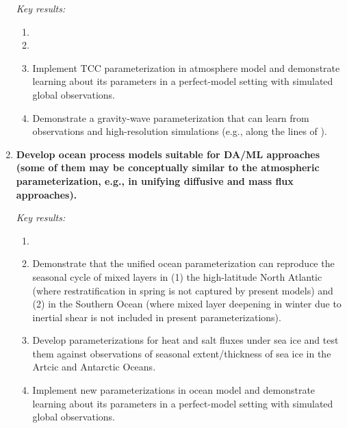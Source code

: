 \documentclass{article}
\begin{document}
\begin{enumerate}
    \emph{Key results:}
    \begin{enumerate}
        \item {}
        \item {}
        \item Implement TCC parameterization in atmosphere model and demonstrate learning about its parameters in a perfect-model setting with simulated global observations.
        \item Demonstrate a gravity-wave parameterization that can learn from observations and high-resolution simulations (e.g., along the lines of \citet{Garner18a, Zhao18a}).
    \end{enumerate}
    
     \item \textbf{Develop ocean process models suitable for DA/ML approaches (some of them may be conceptually similar to the atmospheric parameterization, e.g., in unifying diffusive and mass flux approaches).}
    
    \emph{Key results:}
    \begin{enumerate}
        \item {}
        \item Demonstrate that the unified ocean parameterization can reproduce the seasonal cycle of mixed layers in (1) the high-latitude North Atlantic (where restratification in spring is not captured by present models) and (2) in the Southern Ocean (where mixed layer deepening in winter due to inertial shear is not included in present parameterizations).
        \item Develop parameterizations for heat and salt fluxes under sea ice and test them against observations of seasonal extent/thickness of sea ice in the Artcic and Antarctic Oceans.
        \item Implement new parameterizations in ocean model and demonstrate learning about its parameters in a perfect-model setting with simulated global observations.
    \end{enumerate}
    

\end{enumerate}
\end{document}
